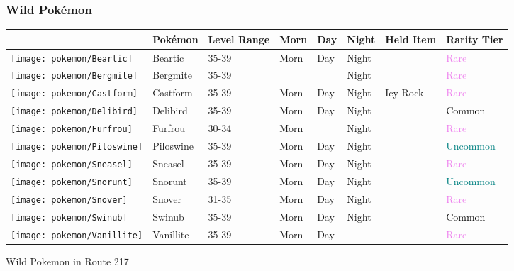 \subsubsection{Wild Pokémon}%
\label{ssubsec:WildPokmon}%
\begin{longtable}{||l l l l l l l l||}%
\hline%
&Pokémon&Level Range&Morn&Day&Night&Held Item&Rarity Tier\\%
\hline%
\endhead%
\hline%
\texttt{[image: pokemon/Beartic]}&Beartic&35{-}39&Morn&Day&Night&&\textcolor{violet}{%
Rare%
}\\%
\hline%
\texttt{[image: pokemon/Bergmite]}&Bergmite&35{-}39&&&Night&&\textcolor{violet}{%
Rare%
}\\%
\hline%
\texttt{[image: pokemon/Castform]}&Castform&35{-}39&Morn&Day&Night&Icy Rock&\textcolor{violet}{%
Rare%
}\\%
\hline%
\texttt{[image: pokemon/Delibird]}&Delibird&35{-}39&Morn&Day&Night&&\textcolor{black}{%
Common%
}\\%
\hline%
\texttt{[image: pokemon/Furfrou]}&Furfrou&30{-}34&Morn&&Night&&\textcolor{violet}{%
Rare%
}\\%
\hline%
\texttt{[image: pokemon/Piloswine]}&Piloswine&35{-}39&Morn&Day&Night&&\textcolor{teal}{%
Uncommon%
}\\%
\hline%
\texttt{[image: pokemon/Sneasel]}&Sneasel&35{-}39&Morn&Day&Night&&\textcolor{violet}{%
Rare%
}\\%
\hline%
\texttt{[image: pokemon/Snorunt]}&Snorunt&35{-}39&Morn&Day&Night&&\textcolor{teal}{%
Uncommon%
}\\%
\hline%
\texttt{[image: pokemon/Snover]}&Snover&31{-}35&Morn&Day&Night&&\textcolor{violet}{%
Rare%
}\\%
\hline%
\texttt{[image: pokemon/Swinub]}&Swinub&35{-}39&Morn&Day&Night&&\textcolor{black}{%
Common%
}\\%
\hline%
\texttt{[image: pokemon/Vanillite]}&Vanillite&35{-}39&Morn&Day&&&\textcolor{violet}{%
Rare%
}\\%
\hline%
\end{longtable}%
\caption{Wild Pokemon in Route 217}